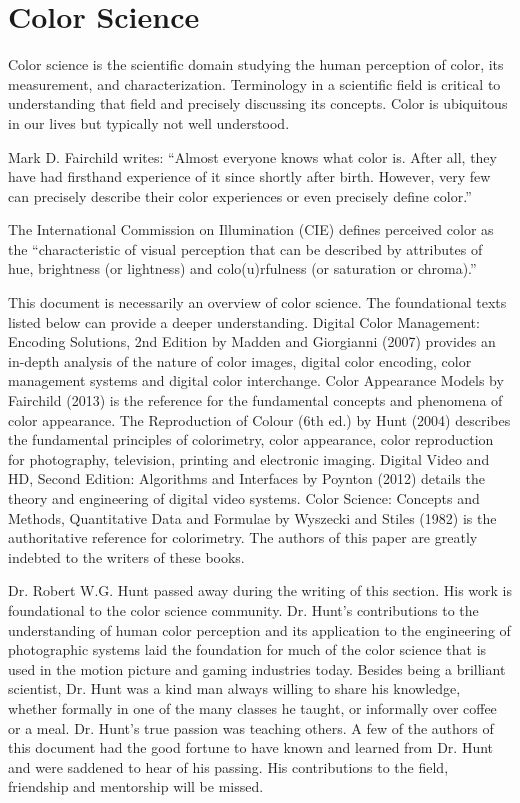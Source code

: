 \chapter{Color Science}

Color science is the scientific domain studying the human perception of color, its measurement, and characterization. Terminology in a scientific field is critical to understanding that field and precisely discussing its concepts. Color is ubiquitous in our lives but typically not well understood.

Mark D. Fairchild writes:
“Almost everyone knows what color is. After all, they have had firsthand experience of it since shortly after birth. However, very few can precisely describe their color experiences or even precisely define color.”

The International Commission on Illumination (CIE) defines perceived color as the “characteristic of visual perception that can be described by attributes of hue, brightness (or lightness) and colo(u)rfulness (or saturation or chroma).”

This document is necessarily an overview of color science. The foundational texts listed below can provide a deeper understanding.
Digital Color Management: Encoding Solutions, 2nd Edition by Madden and Giorgianni (2007) provides an in-depth analysis of the nature of color images, digital color encoding, color management systems and digital color interchange.
Color Appearance Models by Fairchild (2013) is the reference for the fundamental concepts and phenomena of color appearance.
The Reproduction of Colour (6th ed.) by Hunt (2004) describes the fundamental principles of colorimetry, color appearance, color reproduction for photography, television, printing and electronic imaging.
Digital Video and HD, Second Edition: Algorithms and Interfaces by Poynton (2012) details the theory and engineering of digital video systems.
Color Science: Concepts and Methods, Quantitative Data and Formulae by Wyszecki and Stiles (1982) is the authoritative reference for colorimetry.
The authors of this paper are greatly indebted to the writers of these books.

Dr. Robert W.G. Hunt passed away during the writing of this section. His work is foundational to the color science community. Dr. Hunt’s contributions to the understanding of human color perception and its application to the engineering of photographic systems laid the foundation for much of the color science that is used in the motion picture and gaming industries today. Besides being a brilliant scientist, Dr. Hunt was a kind man always willing to share his knowledge, whether formally in one of the many classes he taught, or informally over coffee or a meal. Dr. Hunt’s true passion was teaching others. A few of the authors of this document had the good fortune to have known and learned from Dr. Hunt and were saddened to hear of his passing. His contributions to the field, friendship and mentorship will be missed.

